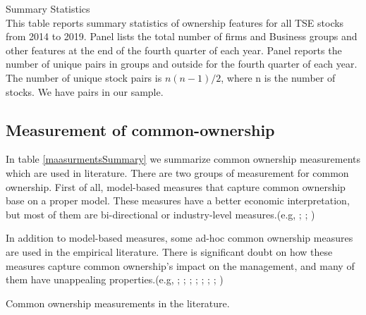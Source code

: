 	
				
		\captionsetup[subtable]{labelformat=parens}
			\renewcommand{\thesubtable}{\Alph{subtable}}
			 \begin{table}[htbp]
			 \caption{ Summary Statistics \\ \small
			 This table reports summary statistics of ownership features for all TSE stocks from 2014 to 2019. Panel  lists the total number of firms and Business groups and other features at the end of the fourth quarter of each year. Panel  reports the number of unique pairs in groups and outside for the fourth quarter of each year. The number of unique stock pairs is $ n(n-1)/2 $, where n is the number of stocks. We have \myname pairs in our sample.  }
			\label{st1}
			\centering
			\label{t2-1}
			\resizebox{1\textwidth}{!}
			{
				
			}
			
		\centering
	\bigskip
		\label{t2-2}
		\resizebox{1\textwidth}{!}
		{
			
		}
	\end{table}
	
	\captionsetup[subtable]{labelformat=empty}

	
	
	


\FloatBarrier


\subsection{{Measurement of common-ownership}}


In table \ref{maasurmentsSummary} we summarize common ownership measurements which are used in literature. There are two groups of measurement for common ownership.
First of all, model-based measures that capture common ownership base on a proper  model. These measures have a better economic interpretation, but most of them are bi-directional or industry-level measures.(e.g, \cite{harford2011institutional}; \cite{azar2018anticompetitive}; \cite{gilje2020s})

In addition to model-based measures, some ad-hoc common ownership measures are used in the empirical literature. There is significant doubt on how these measures capture common ownership's impact on the management, and many of them have unappealing properties.(e.g, \cite{AntonPolk}; \cite{azar2011new}; \cite{freeman2019effects}; \cite{hansen1996externalities};  \cite{he2017product}; \cite{he2019internalizing}; \cite{lewellen2021does}; \cite{newham2018common})
	{\begin{table}[htbp]
			\centering
			\scriptsize
			\caption{ Common ownership measurements in the literature.}
			\label{maasurmentsSummary}
			\resizebox{\textwidth}{!}{
				
			}
		\end{table}
	}
	
